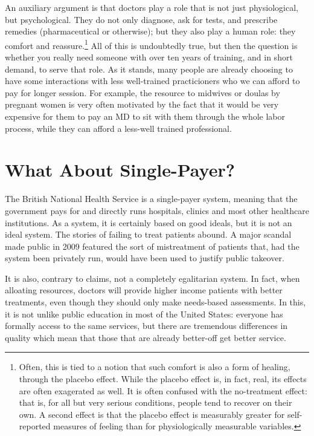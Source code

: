 An auxiliary argument is that doctors play a role that is not just
physiological, but psychological. They do not only diagnose, ask for tests, and
prescribe remedies (pharmaceutical or otherwise); but they also play a human
role: they comfort and reassure.\footnote{Often, this is tied to a notion that
such comfort is also a form of healing, through the placebo effect. While the
placebo effect is, in fact, real, its effects are often exagerated as well. It
is often confused with the no-treatment effect: that is, for all but very
serious conditions, people tend to recover on their own. A second effect is
that the placebo effect is measurably greater for self-reported measures of
feeling than for physiologically measurable variables.} All of this is
undoubtedly true, but then the question is whether you really need someone with
over ten years of training, and in short demand, to serve that role. As it
stands, many people are already choosing to have some interactions with less
well-trained practicioners who we can afford to pay for longer session.  For
example, the resource to midwives or doulas by pregnant women is very often
motivated by the fact that it would be very expensive for them to pay an MD to
sit with them through the whole labor process, while they can afford a
less-well trained professional.

\section{What About Single-Payer?}

The British National Health Service is a single-payer system, meaning that the
government pays for and directly runs hospitals, clinics and most other
healthcare institutions. As a system, it is certainly based on good ideals, but
it is not an ideal system. The stories of failing to treat patients abound. A
major scandal made public in 2009 featured the sort of mistreatment of patients
that, had the system been privately run, would have been used to justify public
takeover.

It is also, contrary to claims, not a completely egalitarian system. In fact,
when alloating resources, doctors will provide higher income patients with
better treatments, even though they should only make needs-based
assessments. In this, it is not
unlike public education in most of the United States: everyone has formally
access to the same services, but there are tremendous differences in quality
which mean that those that are already better-off get better service.

